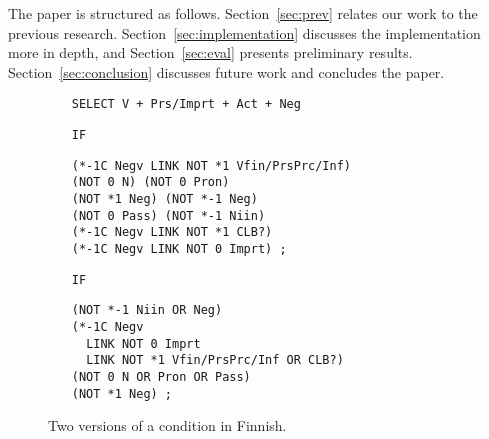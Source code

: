 The paper is structured as follows. Section~\ref{sec:prev} relates our
work to the previous research. 
Section~\ref{sec:implementation} discusses the implementation more in depth, and
Section~\ref{sec:eval} presents preliminary results. 
Section~\ref{sec:conclusion} discusses future work and concludes the paper.


\begin{figure}[t]
\centering
\begin{itemize}

\item[]\texttt{SELECT V + Prs/Imprt + Act + Neg}

\item[\texttt{IF}]
\begin{verbatim}(*-1C Negv LINK NOT *1 Vfin/PrsPrc/Inf) 
(NOT 0 N) (NOT 0 Pron) 
(NOT *1 Neg) (NOT *-1 Neg)
(NOT 0 Pass) (NOT *-1 Niin) 
(*-1C Negv LINK NOT *1 CLB?) 
(*-1C Negv LINK NOT 0 Imprt) ; 
\end{verbatim}

\item[\texttt{IF}]
\begin{verbatim}(NOT *-1 Niin OR Neg)  
(*-1C Negv
  LINK NOT 0 Imprt
  LINK NOT *1 Vfin/PrsPrc/Inf OR CLB?) 
(NOT 0 N OR Pron OR Pass) 
(NOT *1 Neg) ;
\end{verbatim}
\end{itemize}

\caption{Two versions of a condition in Finnish.}

\label{fig:regroup}
\end{figure}






